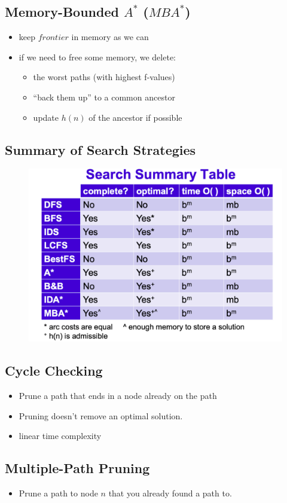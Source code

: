 \documentclass{article}
\begin{document}
\subsection{Memory-Bounded $A^{*}$ ($MBA^{*}$)}

\begin{itemize}
    \item keep $frontier$ in memory as we can
    \item if we need to free some memory, we delete:
        \begin{itemize}
            \item the worst paths (with highest f-values)
            \item ``back them up'' to a common ancestor
            \item update $h(n)$ of the ancestor if possible
        \end{itemize}
\end{itemize}

\subsection{Summary of Search Strategies}

\begin{figure}[H]
    \includegraphics[width=\textwidth]{summary_of_search_strategies}
    \centering
\end{figure}

\subsection{Cycle Checking}

\begin{itemize}
    \item Prune a path that ends in a node already on the path
    \item Pruning doesn't remove an optimal solution.
    \item linear time complexity
\end{itemize}

\subsection{Multiple-Path Pruning}

\begin{itemize}
    \item Prune a path to node $n$ that you already found a path to.
\end{itemize}
\end{document}
